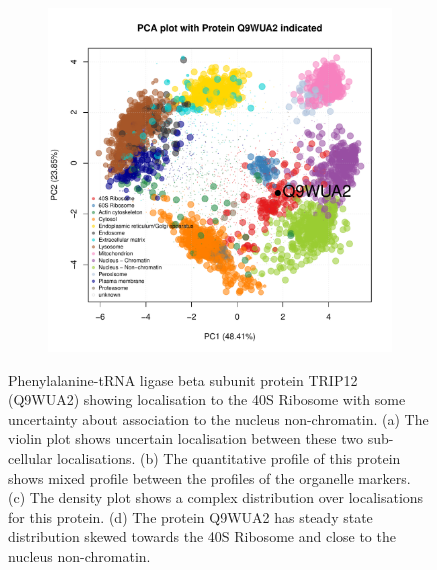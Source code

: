 \documentclass[12pt,english]{article}\usepackage[]{graphicx}\usepackage[]{color}
\makeatletter
\def\maxwidth{ %
  \ifdim\Gin@nat@width>\linewidth
    \linewidth
  \else
    \Gin@nat@width
  \fi
}
\newenvironment{knitrout}{}{} %
\makeatother
\begin{document}
\begin{figure}[p]
\begin{subfigure}[t]{0.5\textwidth}
\begin{knitrout}
{}



\end{knitrout}
    \caption{}
  \end{subfigure}%
  \begin{subfigure}[t]{0.5\textwidth}
    \centering
\begin{knitrout}
\color{fgcolor}

{\centering \includegraphics[width=\maxwidth]{figure/Q9WUA2-pca-1} 

}



\end{knitrout}
    \caption{}
  \end{subfigure}

  \caption{Phenylalanine-tRNA ligase beta subunit protein TRIP12
    (Q9WUA2) showing localisation to the 40S Ribosome with some
    uncertainty about association to the nucleus non-chromatin.  (a)
    The violin plot shows uncertain localisation between these two
    sub-cellular localisations. (b) The quantitative profile of this
    protein shows mixed profile between the profiles of the organelle
    markers. (c) The density plot shows a complex distribution over
    localisations for this protein. (d) The protein Q9WUA2 has steady
    state distribution skewed towards the 40S Ribosome and close to
    the nucleus non-chromatin.}
  \label{fig:Q9WUA2}
\end{figure}
\end{document}
